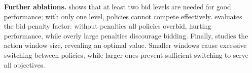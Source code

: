 \textbf{Further ablations.}\quad {} shows that at least two bid levels are needed for good performance; with only one level, policies cannot compete effectively.  evaluates the bid penalty factor: without penalties all policies overbid, hurting performance, while overly large penalties discourage bidding. Finally,  studies the action window size, revealing an optimal value. Smaller windows cause excessive switching between policies, while larger ones prevent sufficient switching to serve all objectives.

